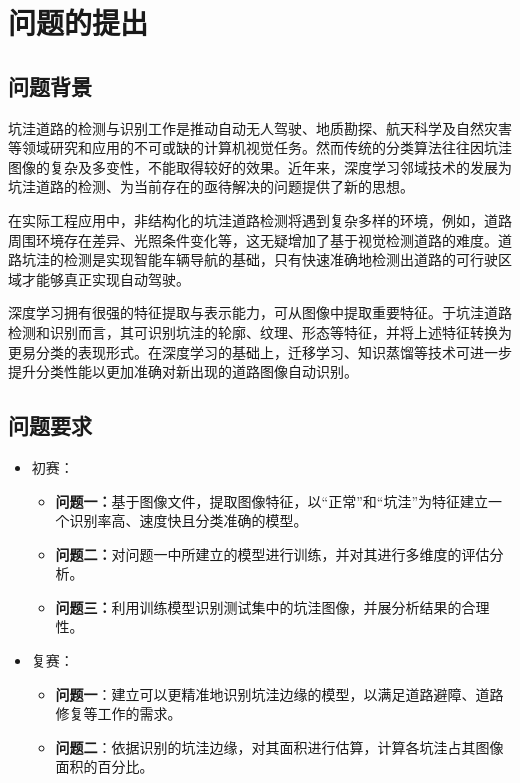 \documentclass{MathorCupmodeling}
\begin{document}
	\pagestyle{empty}
	\tableofcontents
	\newpage
	\pagestyle{fancy}

	\setcounter{page}{1}
	\section{问题的提出}
	\subsection{问题背景}
	坑洼道路的检测与识别工作是推动自动无人驾驶、地质勘探、航天科学及自然灾害等领域研究和应用的不可或缺的计算机视觉任务。然而传统的分类算法往往因坑洼图像的复杂及多变性，不能取得较好的效果。近年来，深度学习邻域技术的发展为坑洼道路的检测、为当前存在的亟待解决的问题提供了新的思想。

	在实际工程应用中，非结构化的坑洼道路检测将遇到复杂多样的环境，例如，道路周围环境存在差异、光照条件变化等，这无疑增加了基于视觉检测道路的难度\textcolor{blue}{\cite{曹江华}}。道路坑洼的检测是实现智能车辆导航的基础，只有快速准确地检测出道路的可行驶区域才能够真正实现自动驾驶。

	深度学习拥有很强的特征提取与表示能力，可从图像中提取重要特征。于坑洼道路检测和识别而言，其可识别坑洼的轮廓、纹理、形态等特征，并将上述特征转换为更易分类的表现形式。在深度学习的基础上，迁移学习、知识蒸馏等技术可进一步提升分类性能以更加准确对新出现的道路图像自动识别。
	\subsection{问题要求}
	\begin{itemize}
		\item {\heiti 初赛：}
		\begin{itemize}
			\item \textbf{问题一：}基于图像文件，提取图像特征，以“正常”和“坑洼”为特征建立一个识别率高、速度快且分类准确的模型。
			\item \textbf{问题二：}对问题一中所建立的模型进行训练，并对其进行多维度的评估分析。
			\item \textbf{问题三：}利用训练模型识别测试集中的坑洼图像，并展分析结果的合理性。
		\end{itemize}
		\item {\heiti 复赛：}
		\begin{itemize}
			\item \textbf{问题一}：建立可以更精准地识别坑洼边缘的模型，以满足道路避障、道路修复等工作的需求。
			\item \textbf{问题二}：依据识别的坑洼边缘，对其面积进行估算，计算各坑洼占其图像面积的百分比。
		\end{itemize}
	\end{itemize}
\end{document}
